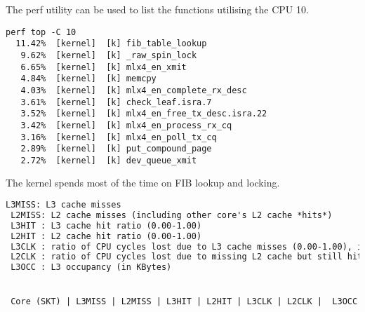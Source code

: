 The perf utility can be used to list the functions utilising the CPU 10.
\begin{lstlisting}
perf top -C 10
  11.42%  [kernel]  [k] fib_table_lookup
   9.62%  [kernel]  [k] _raw_spin_lock
   6.65%  [kernel]  [k] mlx4_en_xmit
   4.84%  [kernel]  [k] memcpy
   4.03%  [kernel]  [k] mlx4_en_complete_rx_desc
   3.61%  [kernel]  [k] check_leaf.isra.7
   3.52%  [kernel]  [k] mlx4_en_free_tx_desc.isra.22
   3.42%  [kernel]  [k] mlx4_en_process_rx_cq
   3.16%  [kernel]  [k] mlx4_en_poll_tx_cq
   2.89%  [kernel]  [k] put_compound_page
   2.72%  [kernel]  [k] dev_queue_xmit
\end{lstlisting}
The kernel spends most of the time on FIB lookup and locking.

\begin{lstlisting}[language=TeX]
 L3MISS: L3 cache misses
 L2MISS: L2 cache misses (including other core's L2 cache *hits*)
 L3HIT : L3 cache hit ratio (0.00-1.00)
 L2HIT : L2 cache hit ratio (0.00-1.00)
 L3CLK : ratio of CPU cycles lost due to L3 cache misses (0.00-1.00), in some cases could be >1.0 due to a higher memory latency
 L2CLK : ratio of CPU cycles lost due to missing L2 cache but still hitting  L3 cache (0.00-1.00)
 L3OCC : L3 occupancy (in KBytes)


 Core (SKT) | L3MISS | L2MISS | L3HIT | L2HIT | L3CLK | L2CLK |  L3OCC


\end{lstlisting}
